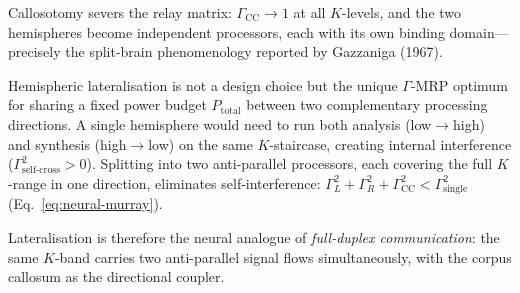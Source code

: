 \documentclass[aps,pre,twocolumn,superscriptaddress,floatfix]{revtex4-2}
\begin{document}
Callosotomy severs the relay matrix:
$\Gamma_{\text{CC}} \to 1$ at all $K$-levels, and
the two hemispheres become independent processors,
each with its own binding domain---precisely the
split-brain phenomenology reported by Gazzaniga
(1967).

\begin{remark}
\label{rem:lateralisation}
Hemispheric lateralisation is not a design choice but
the unique $\Gamma$-MRP optimum for sharing a fixed
power budget $P_{\text{total}}$ between two
complementary processing directions.
A single hemisphere would need to
run both analysis (low$\to$high) and synthesis
(high$\to$low) on the same $K$-staircase,
creating internal interference
($\Gamma^2_{\text{self-cross}} > 0$).
Splitting into two anti-parallel processors,
each covering the full $K$-range in one direction,
eliminates self-interference:
$\Gamma_L^2 + \Gamma_R^2 + \Gamma_{\text{CC}}^2
< \Gamma_{\text{single}}^2$
(Eq.~\ref{eq:neural-murray}).

Lateralisation is therefore the neural analogue of
\emph{full-duplex communication}: the same
$K$-band carries two anti-parallel signal flows
simultaneously, with the corpus callosum as
the directional coupler.
\end{remark}
\end{document}
